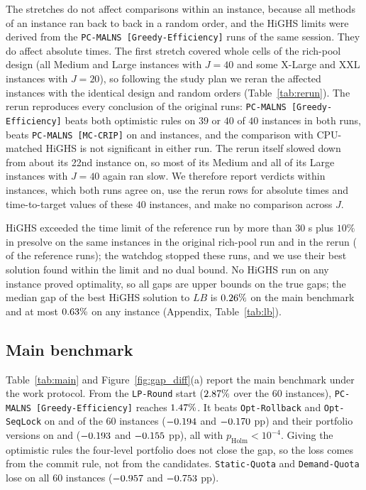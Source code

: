 \documentclass[a4paper,fleqn]{cas-sc}
\newcommand{\pge}{\texttt{PC-MALNS [Greedy-Efficiency]}}
\newcommand{\pmc}{\texttt{PC-MALNS [MC-CRIP]}}
\begin{document}
The stretches do not affect comparisons within an instance, because all methods of an instance ran back to back in a random order, and the HiGHS limits were derived from the \pge{} runs of the same session. They do affect absolute times. The first stretch covered whole cells of the rich-pool design (all Medium and Large instances with $J = 40$ and some X-Large and XXL instances with $J = 20$), so following the study plan we reran the \RerunN{} affected instances with the identical design and random orders (Table~\ref{tab:rerun}). The rerun reproduces every conclusion of the original runs: \pge{} beats both optimistic rules on $39$ or $40$ of $40$ instances in both runs, beats \pmc{} on \RerunOriginalWinsMC{} and \RerunRerunWinsMC{} instances, and the comparison with CPU-matched HiGHS is not significant in either run. The rerun itself slowed down from about its 22nd instance on, so most of its Medium and all of its Large instances with $J = 40$ again ran slow. We therefore report verdicts within instances, which both runs agree on, use the rerun rows for absolute times and time-to-target values of these $40$ instances, and make no comparison across $J$.

HiGHS exceeded the time limit of the reference run by more than $30$ s plus $10\%$ in presolve on the same \RCKilledInstances{} instances in the original rich-pool run and in the rerun (\RCKilled{} of the \RCNReference{} reference runs); the watchdog stopped these runs, and we use their best solution found within the limit and no dual bound. No HiGHS run on any instance proved optimality, so all gaps are upper bounds on the true gaps; the median gap of the best HiGHS solution to $LB$ is $0.26\%$ on the main benchmark and at most $0.63\%$ on any instance (Appendix, Table~\ref{tab:lb}).

\subsection{Main benchmark}
\label{sec:main}
Table~\ref{tab:main} and Figure~\ref{fig:gap_diff}(a) report the main benchmark under the work protocol. From the \texttt{LP-Round} start ($2.87\%$ over the $60$ instances), \pge{} reaches $1.47\%$. It beats \texttt{Opt-Rollback} and \texttt{Opt-SeqLock} on \MainWinsOR{} and \MainWinsOS{} of the $60$ instances ($-0.194$ and $-0.170$ pp) and their portfolio versions on \MainWinsORP{} and \MainWinsOSP{} ($-0.193$ and $-0.155$ pp), all with $p_{\text{Holm}} < 10^{-4}$. Giving the optimistic rules the four-level portfolio does not close the gap, so the loss comes from the commit rule, not from the candidates. \texttt{Static-Quota} and \texttt{Demand-Quota} lose on all $60$ instances ($-0.957$ and $-0.753$ pp).
\end{document}
